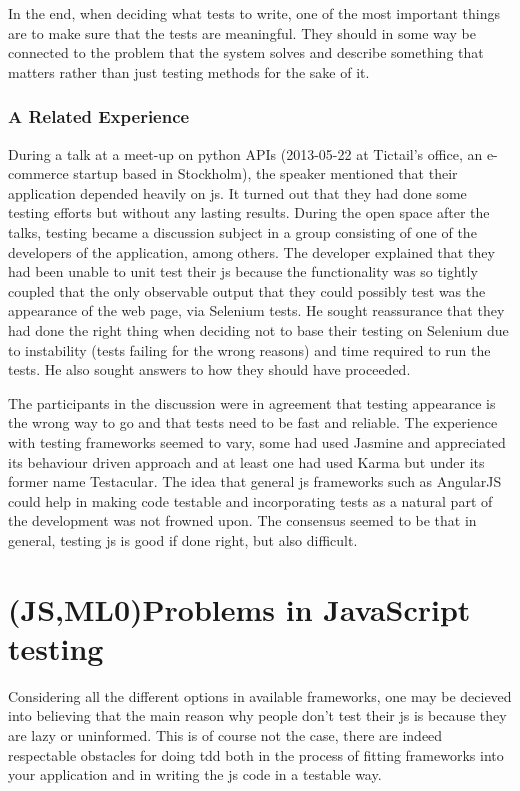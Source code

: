 \documentclass[11pt]{article}
\begin{document}
In the end, when deciding what tests to write, one of the most important things are to make sure that the tests are meaningful. They should in some way be connected to the problem that the system solves and describe something that matters rather than just testing methods for the sake of it. \cite[questions~17-18]{Ahnve}

\subsubsection{A Related Experience}
\label{subsec:openspace}

During a talk at a meet-up on python APIs (2013-05-22 at Tictail's office, an e-commerce startup based in Stockholm), the speaker mentioned that their application depended heavily on \gls{js}. It turned out that they had done some testing efforts but without any lasting results. During the open space after the talks, testing became a discussion subject in a group consisting of one of the developers of the application, among others. The developer explained that they had been unable to unit test their \gls{js} because the functionality was so tightly coupled that the only observable output that they could possibly test was the appearance of the web page, via Selenium tests. He sought reassurance that they had done the right thing when deciding not to base their testing on Selenium due to instability (tests failing for the wrong reasons) and time required to run the tests. He also sought answers to how they should have proceeded.

The participants in the discussion were in agreement that testing appearance is the wrong way to go and that tests need to be fast and reliable. The experience with testing frameworks seemed to vary, some had used Jasmine and appreciated its behaviour driven approach and at least one had used Karma but under its former name Testacular. The idea that general \gls{js} frameworks such as AngularJS could help in making code testable and incorporating tests as a natural part of the development was not frowned upon. The consensus seemed to be that in general, testing \gls{js} is good if done right, but also difficult.


\section{(JS,ML0)Problems in JavaScript testing}
\label{sec:jsproblems}

Considering all the different options in available frameworks, one may be decieved into believing that the main reason why people don't test their \gls{js} is because they are lazy or uninformed. This is of course not the case, there are indeed respectable obstacles for doing \gls{tdd} both in the process of fitting frameworks into your application and in writing the \gls{js} code in a testable way. %
\end{document}
